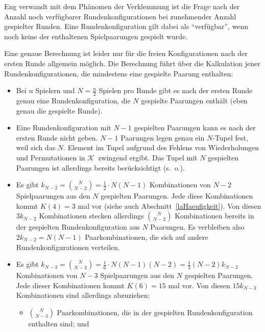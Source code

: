 \documentclass[DIV=15, 10pt]{scrartcl}
\newcommand{\KSet}{$\mathcal{K}$}
\begin{document}

Eng verwandt mit dem Phänomen der Verklemmung ist die Frage nach der Anzahl noch verfügbarer Rundenkonfigurationen bei zunehmender Anzahl gespielter Runden. Eine Rundenkonfiguration gilt dabei als "`verfügbar"', wenn noch keine der enthaltenen Spielpaarungen gespielt wurde.

Eine genaue Berechnung ist leider nur für die freien Konfigurationen nach der ersten Runde allgemein möglich. Die Berechnung führt über die Kalkulation jener Rundenkonfigurationen, die mindestens eine gespielte Paarung enthalten:

\begin{itemize}

\item Bei $n$ Spielern und $N = \frac{n}{2}$ Spielen pro Runde gibt es nach der ersten Runde genau eine Rundenkonfiguration, die $N$ gespielte Paarungen enthält (eben genau die gespielte Runde).

\item Eine Rundenkonfiguration mit $N-1$ gespielten Paarungen kann es nach der ersten Runde nicht geben. $N-1$ Paarungen legen genau ein $N$-Tupel fest, weil sich das $N$. Element im Tupel aufgrund des Fehlens von Wiederholungen und Permutationen in \KSet\ zwingend ergibt. Das Tupel mit $N$ gespielten Paarungen ist allerdings bereits berücksichtigt (s.~o.).

\item Es gibt $k_{N-2} = {N\choose{N-2}} = \frac{1}{2} \cdot N(N-1)$ Kombinationen von $N-2$ Spielpaarungen aus den $N$ gespielten Paarungen. Jede diese Kombinationen kommt $K(4) = 3$ mal vor (siehe auch Abschnitt~\ref{laHaeufigkeit}). Von diesen $3k_{N-2}$ Kombinationen stecken allerdings ${N\choose{N-2}}$ Kombinationen bereits in der gespielten Rundenkonfiguration aus $N$ Paarungen. Es verbleiben also $2k_{N-2} = N(N-1)$ Paarkombinationen, die sich auf andere Rundenkonfigurationen verteilen.

\item Es gibt $k_{N-3} = {N\choose{N-3}} = \frac{1}{6} \cdot N(N-1)(N-2) =
\frac{1}{3} (N-2) k_{N-2}$ Kombinationen von $N-3$ Spielpaarungen aus den $N$ gespielten Paarungen. Jede dieser Kombinationen kommt $K(6) = 15$ mal vor. Von diesen $15k_{N-3}$ Kombinationen sind allerdings abzuziehen:

\begin{itemize}

\item ${N\choose{N-3}}$ Paarkombinationen, die in der gespielten Rundenkonfiguration enthalten sind; und


\end{itemize}
\end{itemize}
\end{document}
